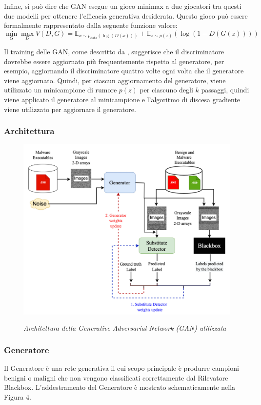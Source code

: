 Infine, si può dire che GAN esegue un gioco minimax a due giocatori tra questi due modelli per ottenere l'efficacia generativa desiderata. Questo gioco può essere formalmente rappresentato dalla seguente funzione valore:
\[
\min_{G} \max_{D} V(D, G) = \mathbb{E}_{x \sim p_{\text{data}}(\log(D(x)))} + \mathbb{E}_{z \sim p(z)}(\log(1 - D(G(z))))
\]

Il training delle GAN, come descritto da , suggerisce che il discriminatore dovrebbe essere aggiornato più frequentemente rispetto al generatore, per esempio, aggiornando il discriminatore quattro volte ogni volta che il generatore viene aggiornato.
Quindi, per ciascun aggiornamento del generatore, viene utilizzato un minicampione di rumore \( p(z) \) per ciascuno degli \( k \) passaggi, quindi viene applicato il generatore al minicampione e l'algoritmo di discesa gradiente viene utilizzato per aggiornare il generatore.


\subsubsection{Architettura}
\begin{figure}[ht]
    \centering
        \centering
        \includegraphics[width=0.6\linewidth]{images/GAN_architecture.png}
        \label{fig:gan_architecture}
        \caption{\emph{Architettura della Generative Adversarial Network (GAN) utilizzata}}
\end{figure}
\newpage
\subsubsection{Generatore}
Il Generatore è una rete generativa il cui scopo principale è produrre campioni benigni o maligni che non vengono classificati correttamente dal Rilevatore Blackbox. L'addestramento del Generatore è mostrato schematicamente nella Figura 4.

